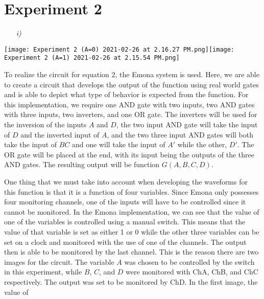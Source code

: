 \documentclass[12pt]{article}
\newcommand{\twoobjects}[2]{%
  \leavevmode\vbox{\hbox{#1}\nointerlineskip\hbox{#2}}%
}
\begin{document}
    \section*{Experiment 2}
    \begin{itemize}
        \item[\textit{i)}]
    \end{itemize}
    \begin{center}
        \twoobjects
            {\texttt{[image: Experiment 2 (A=0) 2021-02-26
            at 2.16.27 PM.png]}}
            {\texttt{[image: Experiment 2 (A=1) 2021-02-26
            at 2.15.54 PM.png]}}
    \end{center}
    \par To realize the circuit for equation 2, the Emona system is used. Here,
    we are able to create a circuit that develops the output of the function
    using real world gates and is able to depict what type of behavior is
    expected from the function. For this implementation, we require one AND gate
    with two inputs, two AND gates with three inputs, two inverters, and one OR
    gate. The inverters will be used for the inversion of the inputs $A$ and
    $D$, the two input AND gate will take the input of $D$ and the inverted
    input of $A$, and the two three input AND gates will both take the input of
    $BC$ and one will take the input of $A'$ while the other, $D'$. The OR gate
    will be placed at the end, with its input being the outputs of the three AND
    gates. The resulting output will be function $G\left(A,B,C,D\right)$.
    \par One thing that we must take into account when developing the waveforms
    for this function is that it is a function of four variables. Since Emona
    only possesses four monitoring channels, one of the inputs will have to be
    controlled since it cannot be monitored. In the Emona implementation, we can
    see that the value of one of the variables is controlled using a manual
    switch. This means that the value of that variable is set as either 1 or 0
    while the other three variables can be set on a clock and monitored with the
    use of one of the channels. The output then is able to be monitored by the
    last channel. This is the reason there are two images for the circuit.  The
    variable $A$ was chosen to be controlled by the switch in this experiment,
    while $B$, $C$, and $D$ were monitored with ChA, ChB, and ChC respectively.
    The output was set to be monitored by ChD. In the first image, the value of
\end{document}
